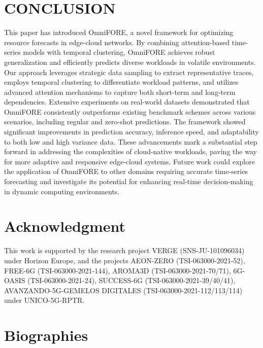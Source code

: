 \documentclass{ieeetmlcn}
\begin{document}
\section*{CONCLUSION}
\label{sec: Conclusion}
This paper has introduced OmniFORE, a novel framework for optimizing resource forecasts in edge-cloud networks. By combining attention-based time-series models with temporal clustering, OmniFORE achieves robust generalization and efficiently predicts diverse workloads in volatile environments. Our approach leverages strategic data sampling to extract representative traces, employs temporal clustering to differentiate workload patterns, and utilizes advanced attention mechanisms to capture both short-term and long-term dependencies. Extensive experiments on real-world datasets demonstrated that OmniFORE consistently outperforms existing benchmark schemes across various scenarios, including regular and zero-shot predictions. The framework showed significant improvements in prediction accuracy, inference speed, and adaptability to both low and high variance data. These advancements mark a substantial step forward in addressing the complexities of cloud-native workloads, paving the way for more adaptive and responsive edge-cloud systems. Future work could explore the application of OmniFORE to other domains requiring accurate time-series forecasting and investigate its potential for enhancing real-time decision-making in dynamic computing environments.

\section*{Acknowledgment}
This work is supported by the research project VERGE (SNS-JU-101096034) under Horizon Europe, and the projects AEON-ZERO (TSI-063000-2021-52), FREE-6G (TSI-063000-2021-144), AROMA3D (TSI-063000-2021-70/71), 6G-OASIS (TSI-063000-2021-24), SUCCESS-6G (TSI-063000-2021-39/40/41), AVANZANDO-5G-GEMELOS DIGITALES (TSI-063000-2021-112/113/114) under UNICO-5G-RPTR.


\section*{Biographies}
\end{document}
